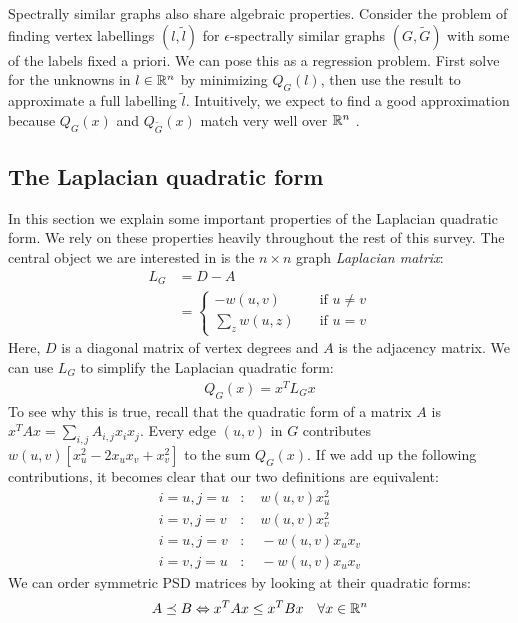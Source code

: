 \documentclass{article}
\begin{document}
Spectrally similar graphs also share algebraic properties. Consider the
problem of finding vertex labellings $(l, \tilde{l})$ for
$\epsilon$-spectrally similar graphs $(G, \tilde{G})$ with some of the
labels fixed a priori. We can pose this as a regression problem. First solve
for the unknowns in $l \in \mathbb{R}^n$ by minimizing $Q_G(l)$, then use the
result to approximate a full labelling $\tilde{l}$. Intuitively, we expect
to find a good approximation because $Q_G(x)$ and $Q_{\tilde{G}}(x)$ match
very well over $\mathbb{R}^n$ \cite{TheSurvey}.

\subsection{The Laplacian quadratic form}

In this section we explain some important properties of the Laplacian
quadratic form. We rely on these properties heavily throughout the rest of
this survey. The central object we are interested in is the $n \times n$
graph \textit{Laplacian matrix}:
\begin{align*}
    L_G &= D - A \\
        &= 
    \begin{cases}
        -w(u, v) \quad &\text{if } u \not= v \\
        \sum_{z} w(u, z) \quad &\text{if } u = v
    \end{cases}
\end{align*}
Here, $D$ is a diagonal matrix of vertex degrees and $A$ is the adjacency
matrix.  We can use $L_G$ to simplify the Laplacian quadratic form:
\begin{align*}
    Q_G(x) = x^TL_Gx
\end{align*}
To see why this is true, recall that the quadratic form of a matrix $A$ is
$x^TAx = \sum_{i,j} A_{i,j}x_ix_j$.  Every edge $(u, v)$ in $G$ contributes
$w(u, v)[x_u^2 - 2x_ux_v + x_v^2]$ to the sum $Q_G(x)$. If we add up the
following contributions, it becomes clear that our two definitions are
equivalent:
\begin{align*}
    i = u, j = u &:\quad w(u, v)x_u^2 \\
    i = v, j = v &:\quad w(u, v)x_v^2 \\
    i = u, j = v &:\quad -w(u, v)x_ux_v \\
    i = v, j = u &:\quad -w(u, v)x_ux_v
\end{align*}
We can order symmetric PSD matrices by looking at their quadratic forms:
\begin{align*}
    A \preceq B \Leftrightarrow x^TAx \leq x^TBx \quad \forall{x \in \mathbb{R}^n}
\end{align*}
\end{document}
